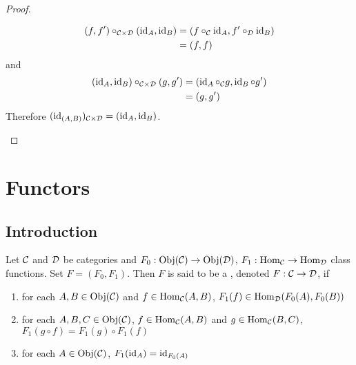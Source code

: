 \documentclass{book}
\begin{document}
\begin{proof}
\begin{itemize}
			\begin{align*}
				(f, f') \circ_{\mathcal{C} \times \mathcal{D}} (\operatorname{id}_A, \operatorname{id}_{B}) 
				& = (f \circ_{\mathcal{C}} \operatorname{id}_A, f' \circ_{\mathcal{D}} \operatorname{id}_{B}) \\
				& = (f, f)
			\end{align*}
			and
			\begin{align*}
				(\operatorname{id}_A, \operatorname{id}_{B})  \circ_{\mathcal{C} \times \mathcal{D}} (g, g')
				& = (\operatorname{id}_A \circ_{\mathcal{C}} g , \operatorname{id}_{B} \circ g') \\
				& = (g, g')
			\end{align*}
			Therefore $(\operatorname{id}_{(A, B)})_{\mathcal{C} \times \mathcal{D}} = (\operatorname{id}_A, \operatorname{id}_{B})$.
		\end{itemize}
	\end{proof}
	














	
	
	

	
	
	
	
	
	
	
	
	
	
	
	
	
	
	
	
	
	
	
	
	
	
	
	
	
	
	\newpage
	\section{Functors}
	
	
	\subsection{Introduction}
	
	\begin{defn} 
		Let $\mathcal{C}$ and $\mathcal{D}$ be categories and $F_0 : \operatorname{Obj}(\mathcal{C}) \rightarrow \operatorname{Obj}(\mathcal{D})$, $F_1: \operatorname{Hom}_{\mathcal{C}} \rightarrow \operatorname{Hom}_{\mathcal{D}}$ class functions. Set $F = (F_0, F_1)$. Then $F$ is said to be a , denoted  $F:\mathcal{C} \rightarrow \mathcal{D}$, if 
		\begin{enumerate}
			\item for each $A,B \in \operatorname{Obj}(\mathcal{C})$ and $f \in \operatorname{Hom}_{\mathcal{C}}(A, B)$, $F_1(f) \in \operatorname{Hom}_{\mathcal{D}}(F_0(A), F_0(B))$
			\item for each $A,B, C \in \operatorname{Obj}(\mathcal{C})$, $f \in \operatorname{Hom}_{\mathcal{C}}(A,B)$ and $g \in \operatorname{Hom}_{\mathcal{C}}(B, C)$, $F_1(g \circ f) = F_1(g) \circ F_1(f)$
			\item for each $A \in \operatorname{Obj}(\mathcal{C})$,  $F_1(\operatorname{id}_A) = \operatorname{id}_{F_0(A)}$
		\end{enumerate}
	\end{defn}
\end{document}
